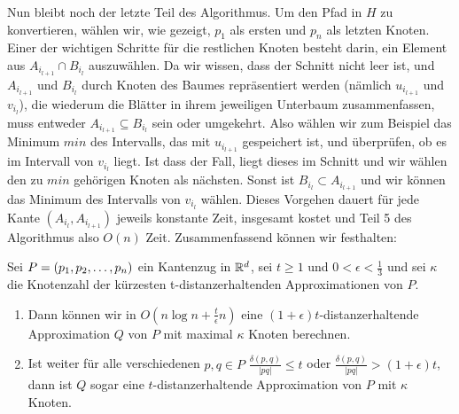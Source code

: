     Nun bleibt noch der letzte Teil des Algorithmus. 
    Um den Pfad in $H$ zu konvertieren, wählen wir, wie gezeigt, $p_1$ als ersten und $p_n$ als letzten Knoten. 
    Einer der wichtigen Schritte für die restlichen Knoten besteht darin, ein Element aus $A_{i_{l+1}} \cap B_{i_l}$ auszuwählen. 
    Da wir wissen, dass der Schnitt nicht leer ist, und $A_{i_{l+1}}$ und $B_{i_l}$ durch Knoten des Baumes repräsentiert werden (nämlich $u_{i_{l+1}}$ und $v_{i_l}$), die wiederum die Blätter in ihrem jeweiligen Unterbaum zusammenfassen, muss entweder $A_{i_{l+1}}\subseteq B_{i_l}$ sein oder umgekehrt. 
    Also wählen wir zum Beispiel das Minimum $min$ des Intervalls, das mit $u_{i_{l+1}}$ gespeichert ist, und überprüfen, ob es im Intervall von $v_{i_l}$ liegt. 
    Ist dass der Fall, liegt dieses im Schnitt und wir wählen den zu $min$ gehörigen Knoten als nächsten. Sonst ist $B_{i_l}\subset A_{i_{l+1}}$ und wir können das Minimum des Intervalls von $v_{i_l}$ wählen. Dieses Vorgehen dauert für jede Kante $(A_{i_l}, A_{i_{l+1}})$ jeweils konstante Zeit, insgesamt kostet und Teil 5 des Algorithmus also $O(n)$ Zeit.
    Zusammenfassend können wir festhalten:
    
    \begin{theorem}
    	\label{theo:mvpstime}
    	Sei $P = (p_1, p_2, \mathellipsis, p_n)$ ein Kantenzug in $\mathbb{R}^d$, sei $t \geq 1$ und $0 < \epsilon < \frac{1}{3}$ und sei $\kappa$ die Knotenzahl der kürzesten t-distanzerhaltenden Approximationen von $P$.
    	\begin{enumerate}
    		\item Dann können wir in $O(n \log n + \frac{t}{\epsilon}n)$ eine $(1 + \epsilon)t$-distanzerhaltende Approximation $Q$ von $P$ mit maximal $\kappa$ Knoten berechnen.
    		\item Ist weiter für alle verschiedenen $p, q \in P$ $\frac{\delta(p,q)}{|pq|} \leq t$ oder $\frac{\delta(p,q)}{|pq|} > (1 + \epsilon)t$, dann ist $Q$ sogar eine $t$-distanzerhaltende Approximation von $P$ mit $\kappa$ Knoten.
    	\end{enumerate}
    	
    \end{theorem}